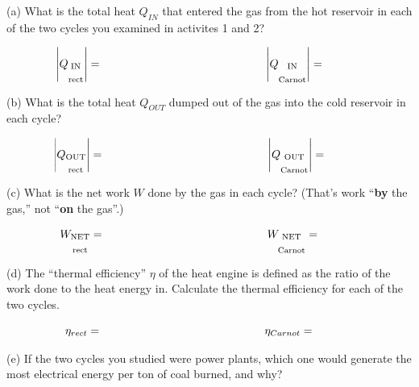 (a)  What is the total heat $Q_{IN}$ that entered the gas from the hot reservoir in each of the two cycles you examined in activites 1 and 2?

\begin{displaymath}
\hspace{-0.5in} \left| Q_{\substack{\textrm{IN} \\ \\ \textrm{rect}}} \right| =
\hspace{2in} \left| Q_{\substack{\textrm{IN} \\ \\ \textrm{Carnot}}} \right|=
\end{displaymath}

(b) What is the total heat $Q_{OUT}$ dumped out of the gas into the cold reservoir in each cycle?

\begin{displaymath}
\hspace{-0.5in} \left| Q_{\substack{\textrm{OUT} \\ \\ \textrm{rect}}} \right| =
\hspace{2in} \left| Q_{\substack{\textrm{OUT} \\ \\ \textrm{Carnot}}} \right|=
\end{displaymath}

(c)  What is the net work $W$ done by the gas in each cycle?  (That's work ``\textbf{by} the gas,'' not ``\textbf{on} the gas''.) 

\begin{displaymath}
\hspace{-0.5in} W_{\substack{\textrm{NET} \\ \\ \textrm{rect}}} =
\hspace{2in} W_{\substack{\textrm{NET} \\ \\ \textrm{Carnot}}} =
\end{displaymath}

(d)  The ``thermal efficiency'' $\eta$ of the heat engine is defined as the ratio of the work done to the heat energy in.  Calculate the thermal efficiency for each of the two cycles.

\begin{displaymath}
\hspace{-0.5in} \eta_{rect} =
\hspace{2in} \eta_{Carnot} =
\end{displaymath}

\bigskip

(e) If the two cycles you studied were power plants, which one would generate the most electrical energy per ton of coal burned, and why?





